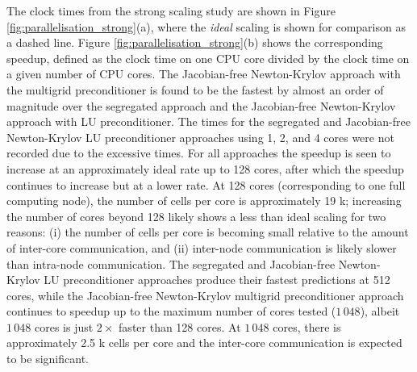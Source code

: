 \documentclass[sn-mathphys,Numbered]{sn-jnl}%
\begin{document}
The clock times from the strong scaling study are shown in Figure \ref{fig:parallelisation_strong}(a), where the \emph{ideal} scaling is shown for comparison as a dashed line.
Figure \ref{fig:parallelisation_strong}(b) shows the corresponding speedup, defined as the clock time on one CPU core divided by the clock time on a given number of CPU cores.
The Jacobian-free Newton-Krylov approach with the multigrid preconditioner is found to be the fastest by almost an order of magnitude over the segregated approach and the Jacobian-free Newton-Krylov approach with LU preconditioner.
The times for the segregated and Jacobian-free Newton-Krylov LU preconditioner approaches using 1, 2, and 4 cores were not recorded due to the excessive times.
For all approaches the speedup is seen to increase at an approximately ideal rate up to 128 cores, after which the speedup continues to increase but at a lower rate.
At 128 cores (corresponding to one full computing node), the number of cells per core is approximately 19 k; increasing the number of cores beyond 128 likely shows a less than ideal scaling for two reasons: (i) the number of cells per core is becoming small relative to the amount of inter-core communication, and (ii) inter-node communication is likely slower than intra-node communication.
The segregated and Jacobian-free Newton-Krylov LU preconditioner approaches produce their fastest predictions at 512 cores, while the Jacobian-free Newton-Krylov multigrid preconditioner approach continues to speedup up to the maximum number of cores tested ($1\,048$), albeit $1\,048$ cores is just $2\times$ faster than 128 cores.
At $1\,048$ cores, there is approximately 2.5 k cells per core and the inter-core communication is expected to be significant.
\end{document}

